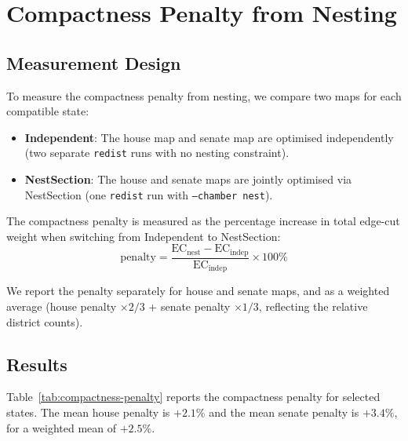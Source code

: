 \section{Compactness Penalty from Nesting}
\label{sec:penalty}

\subsection{Measurement Design}
\label{sec:penalty:design}

To measure the compactness penalty from nesting, we compare two maps for each
compatible state:
\begin{itemize}
  \item \textbf{Independent}: The house map and senate map are optimised
    independently (two separate \texttt{redist} runs with no nesting constraint).
  \item \textbf{NestSection}: The house and senate maps are jointly optimised
    via NestSection (one \texttt{redist} run with \texttt{--chamber nest}).
\end{itemize}

The compactness penalty is measured as the percentage increase in total
edge-cut weight when switching from Independent to NestSection:
\[
  \text{penalty} = \frac{\text{EC}_{\text{nest}} - \text{EC}_{\text{indep}}}{\text{EC}_{\text{indep}}} \times 100\%
\]

We report the penalty separately for house and senate maps, and as a
weighted average (house penalty $\times 2/3$ + senate penalty $\times 1/3$,
reflecting the relative district counts).

\subsection{Results}
\label{sec:penalty:results}

Table~\ref{tab:compactness-penalty} reports the compactness penalty for
selected states. The mean house penalty is $+2.1\%$ and the mean senate
penalty is $+3.4\%$, for a weighted mean of $+2.5\%$.

